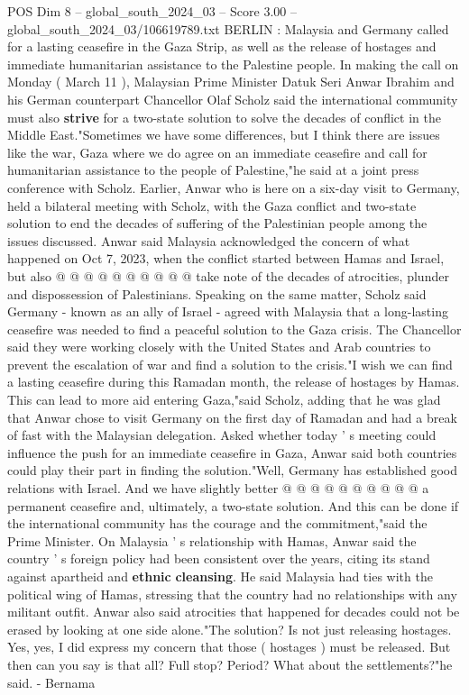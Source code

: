 \begin{textsample}{POS Dim 8 – global\_south\_2024\_03 – Score 3.00 – global\_south\_2024\_03/106619789.txt}  \label{ex:f8_pos_424}
BERLIN : Malaysia and Germany called for a lasting ceasefire in the Gaza Strip, as well as the release of hostages and immediate humanitarian assistance to the Palestine people.
In making the call on Monday ( March 11 ), Malaysian Prime Minister Datuk Seri Anwar Ibrahim and his German counterpart Chancellor Olaf Scholz said the international community must also \textbf{strive} for a two-state solution to solve the decades of conflict in the Middle East."Sometimes we have some differences, but I think there are issues like the war, Gaza where we do agree on an immediate ceasefire and call for humanitarian assistance to the people of Palestine,"he said at a joint press conference with Scholz.
Earlier, Anwar who is here on a six-day visit to Germany, held a bilateral meeting with Scholz, with the Gaza conflict and two-state solution to end the decades of suffering of the Palestinian people among the issues discussed.
Anwar said Malaysia acknowledged the concern of what happened on Oct 7, 2023, when the conflict started between Hamas and Israel, but also @ @ @ @ @ @ @ @ @ @ take note of the decades of atrocities, plunder and dispossession of Palestinians.
Speaking on the same matter, Scholz said Germany - known as an ally of Israel - agreed with Malaysia that a long-lasting ceasefire was needed to find a peaceful solution to the Gaza crisis.
The Chancellor said they were working closely with the United States and Arab countries to prevent the escalation of war and find a solution to the crisis."I wish we can find a lasting ceasefire during this Ramadan month, the release of hostages by Hamas.
This can lead to more aid entering Gaza,"said Scholz, adding that he was glad that Anwar chose to visit Germany on the first day of Ramadan and had a break of fast with the Malaysian delegation.
Asked whether today ' s meeting could influence the push for an immediate ceasefire in Gaza, Anwar said both countries could play their part in finding the solution."Well, Germany has established good relations with Israel.
And we have slightly better @ @ @ @ @ @ @ @ @ @ a permanent ceasefire and, ultimately, a two-state solution.
And this can be done if the international community has the courage and the commitment,"said the Prime Minister.
On Malaysia ' s relationship with Hamas, Anwar said the country ' s foreign policy had been consistent over the years, citing its stand against apartheid and \textbf{ethnic} \textbf{cleansing}.
He said Malaysia had ties with the political wing of Hamas, stressing that the country had no relationships with any militant outfit.
Anwar also said atrocities that happened for decades could not be erased by looking at one side alone."The solution?
Is not just releasing hostages.
Yes, yes, I did express my concern that those ( hostages ) must be released.
But then can you say is that all?
Full stop?
Period?
What about the settlements?"he said. - Bernama

\end{textsample}
